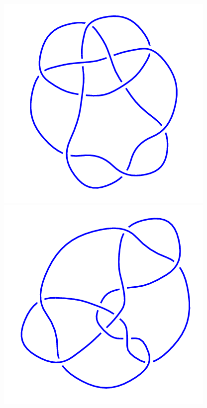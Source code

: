 \begin{figure}[H]
\begin{minipage}[b]{.18\linewidth}
    \end{minipage}
    \begin{minipage}[b]{.18\linewidth}
        \centering
        \includegraphics[width=\linewidth]{../data/10_159.png}
    \end{minipage}
    \begin{minipage}[b]{.18\linewidth}
        \centering
        \includegraphics[width=\linewidth]{../data/10_160.png}

\end{minipage}
\end{figure}
